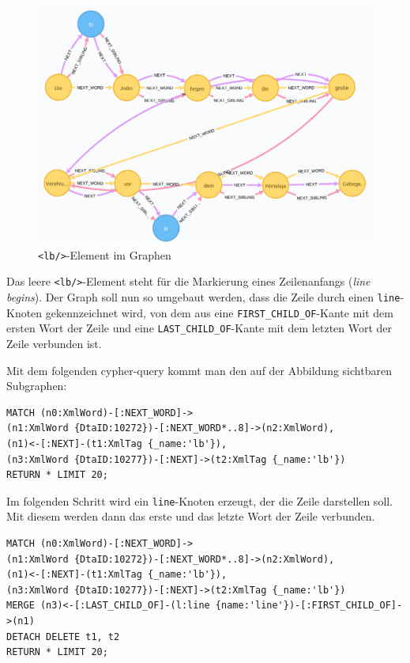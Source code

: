 \begin{figure}
\centering
\includegraphics{Bilder/TEI2Graph/lb-im-Graph2.png}
\caption{\texttt{\textless{}lb/\textgreater{}}-Element im Graphen}
\end{figure}

Das leere \texttt{\textless{}lb/\textgreater{}}-Element steht für die
Markierung eines Zeilenanfangs (\emph{line begins}). Der Graph soll nun
so umgebaut werden, dass die Zeile durch einen \texttt{line}-Knoten
gekennzeichnet wird, von dem aus eine \texttt{FIRST\_CHILD\_OF}-Kante
mit dem ersten Wort der Zeile und eine \texttt{LAST\_CHILD\_OF}-Kante
mit dem letzten Wort der Zeile verbunden ist.

Mit dem folgenden cypher-query kommt man den auf der Abbildung
sichtbaren Subgraphen:

\begin{verbatim}
MATCH (n0:XmlWord)-[:NEXT_WORD]->
(n1:XmlWord {DtaID:10272})-[:NEXT_WORD*..8]->(n2:XmlWord),
(n1)<-[:NEXT]-(t1:XmlTag {_name:'lb'}),
(n3:XmlWord {DtaID:10277})-[:NEXT]->(t2:XmlTag {_name:'lb'})
RETURN * LIMIT 20;
\end{verbatim}

Im folgenden Schritt wird ein \texttt{line}-Knoten erzeugt, der die
Zeile darstellen soll. Mit diesem werden dann das erste und das letzte
Wort der Zeile verbunden.

\begin{verbatim}
MATCH (n0:XmlWord)-[:NEXT_WORD]->
(n1:XmlWord {DtaID:10272})-[:NEXT_WORD*..8]->(n2:XmlWord),
(n1)<-[:NEXT]-(t1:XmlTag {_name:'lb'}),
(n3:XmlWord {DtaID:10277})-[:NEXT]->(t2:XmlTag {_name:'lb'})
MERGE (n3)<-[:LAST_CHILD_OF]-(l:line {name:'line'})-[:FIRST_CHILD_OF]->(n1)
DETACH DELETE t1, t2
RETURN * LIMIT 20;
\end{verbatim}

